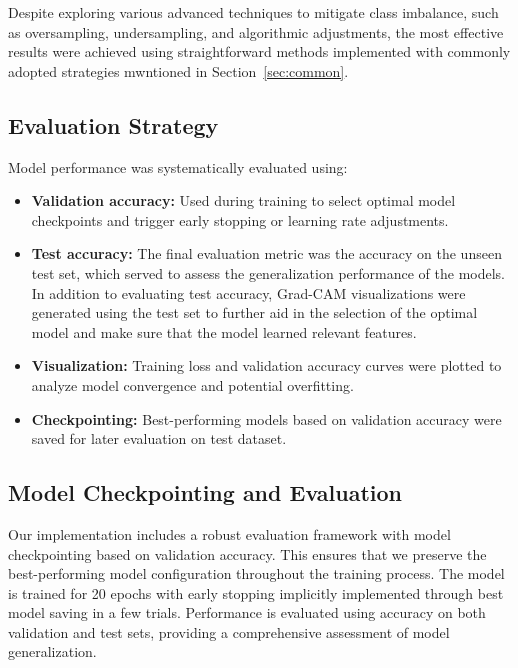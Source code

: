 \documentclass[a4paper,12pt]{report}
\begin{document}
Despite exploring various advanced techniques to mitigate class imbalance, such as oversampling, undersampling, and algorithmic adjustments, the most effective results were achieved using straightforward methods implemented with commonly adopted strategies mwntioned in Section~\ref{sec:common}.




\subsection{Evaluation Strategy}

Model performance was systematically evaluated using:

\begin{itemize}
    \item \textbf{Validation accuracy:} Used during training to select optimal model checkpoints and trigger early stopping or learning rate adjustments.
    \item \textbf{Test accuracy:} The final evaluation metric was the accuracy on the unseen test set, which served to assess the generalization performance of the models. In addition to evaluating test accuracy, Grad-CAM visualizations were generated using the test set to further aid in the selection of the optimal model and make sure that the model learned relevant features.
    \item \textbf{Visualization:} Training loss and validation accuracy curves were plotted to analyze model convergence and potential overfitting.
    \item \textbf{Checkpointing:} Best-performing models based on validation accuracy were saved for later evaluation on test dataset.
\end{itemize}

\subsection{Model Checkpointing and Evaluation}

Our implementation includes a robust evaluation framework with model checkpointing based on validation accuracy. This ensures that we preserve the best-performing model configuration throughout the training process. The model is trained for 20 epochs with early stopping implicitly implemented through best model saving in a few trials. Performance is evaluated using accuracy on both validation and test sets, providing a comprehensive assessment of model generalization.
\end{document}
